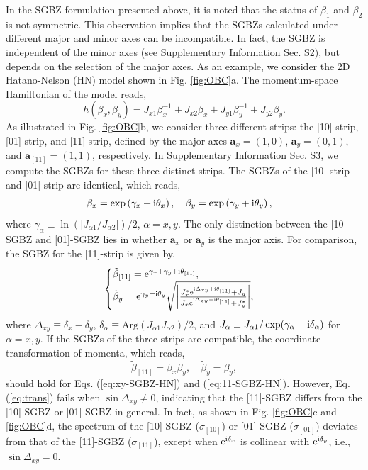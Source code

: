 \documentclass[pdflatex,sn-nature,iicol]{sn-jnl}
\theoremstyle{thmstyleone}%
\theoremstyle{thmstyletwo}%
\theoremstyle{thmstylethree}%
\begin{document}
In the SGBZ formulation presented above, it is noted that the status
of $\beta_{1}$ and $\beta_{2}$ is not symmetric. This observation
implies that the SGBZs calculated under different major and minor
axes can be incompatible. In fact, the SGBZ is independent of the
minor axes (see Supplementary Information Sec. S2), but depends on
the selection of the major axes. As an example, we consider the 2D
Hatano-Nelson (HN) model shown in Fig. \ref{fig:OBC}a. The momentum-space
Hamiltonian of the model reads, 
\begin{equation}
h\left(\beta_{x},\beta_{y}\right)=J_{x1}\beta_{x}^{-1}+J_{x2}\beta_{x}+J_{y1}\beta_{y}^{-1}+J_{y2}\beta_{y}.\label{eq:HN}
\end{equation}
As illustrated in Fig. \ref{fig:OBC}b, we consider three different
strips: the {[}10{]}-strip, {[}01{]}-strip, and {[}11{]}-strip, defined
by the major axes $\mathbf{a}_{x}=(1,0)$, $\mathbf{a}_{y}=(0,1)$,
and $\mathbf{a}_{[11]}=(1,1)$, respectively. In Supplementary Information
Sec. S3, we compute the SGBZs for these three distinct strips. The
SGBZs of the {[}10{]}-strip and {[}01{]}-strip are identical, which
reads, 
\begin{align}
\beta_{x} & =\exp\left(\gamma_{x}+\mathrm{i}\theta_{x}\right),\quad\beta_{y}=\exp\left(\gamma_{y}+\mathrm{i}\theta_{y}\right),\label{eq:xy-SGBZ-HN}
\end{align}
where $\gamma_{\alpha}\equiv\ln(|J_{\alpha1}/J_{\alpha2}|)/2$, $\alpha=x,y$.
The only distinction between the {[}10{]}-SGBZ and {[}01{]}-SGBZ lies
in whether $\mathbf{a}_{x}$ or $\mathbf{a}_{y}$ is the major axis.
For comparison, the SGBZ for the {[}11{]}-strip is given by, 
\begin{equation}
\begin{cases}
\tilde{\beta}_{[11]}=\mathrm{e}^{\gamma_{x}+\gamma_{y}+\mathrm{i}\theta_{[11]}},\\
\tilde{\beta}_{y}=\mathrm{e}^{\gamma_{y}+\mathrm{i}\theta_{y}}\sqrt{\left|\frac{J_{x}^{*}\mathrm{e}^{\mathrm{i}\Delta_{xy}+\mathrm{i}\theta_{[11]}}+J_{y}}{J_{x}\mathrm{e}^{\mathrm{i}\Delta_{xy}-\mathrm{i}\theta_{[11]}}+J_{y}^{*}}\right|},
\end{cases}\label{eq:11-SGBZ-HN}
\end{equation}
where $\Delta_{xy}\equiv\delta_{x}-\delta_{y}$, $\delta_{\alpha}\equiv\text{Arg}(J_{\alpha1}J_{\alpha2})/2$,
and $J_{\alpha}\equiv J_{\alpha1}/\exp(\gamma_{\alpha}+\mathrm{i}\delta_{\alpha})$
for $\alpha=x,y$. If the SGBZs of the three strips are compatible,
the coordinate transformation of momenta, which reads, 
\begin{equation}
\tilde{\beta}_{[11]}=\beta_{x}\beta_{y},\quad\tilde{\beta}_{y}=\beta_{y},\label{eq:trans}
\end{equation}
should hold for Eqs. (\ref{eq:xy-SGBZ-HN}) and (\ref{eq:11-SGBZ-HN}).
However, Eq. (\ref{eq:trans}) fails when $\sin\Delta_{xy}\neq0$,
indicating that the {[}11{]}-SGBZ differs from the {[}10{]}-SGBZ or
{[}01{]}-SGBZ in general. In fact, as shown in Fig. \ref{fig:OBC}c
and \ref{fig:OBC}d, the spectrum of the {[}10{]}-SGBZ ($\sigma_{[10]}$)
or {[}01{]}-SGBZ ($\sigma_{[01]}$) deviates from that of the {[}11{]}-SGBZ
($\sigma_{[11]}$), except when $\mathrm{e}^{\mathrm{i}\delta_{x}}$ is collinear
with $\mathrm{e}^{\mathrm{i}\delta_{y}}$, i.e., $\sin\Delta_{xy}=0$.
\end{document}
